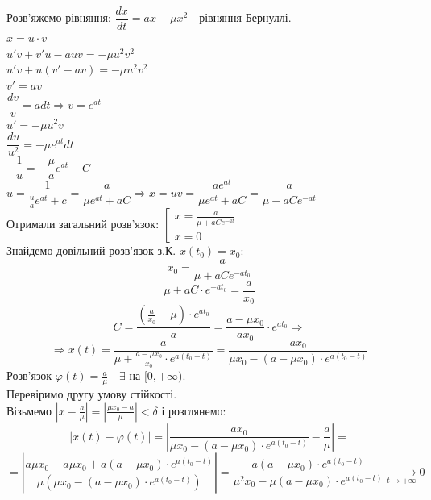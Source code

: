 Розв'яжемо рівняння: $ \dfrac{dx}{dt} = ax - \mu x^2 $ - рівняння Бернуллі.\\
$x = u\cdot v $\\
$u'v + v'u - auv = - \mu u^2 v^2 $\\
$u'v + u(v' - av) = - \mu u^2 v^2 $\\
$v' = av$\\
$ \dfrac{dv}{v} = adt \Longrightarrow v = e^{at}$\\
$u' =- \mu u^2 v$\\
$ \dfrac{du}{u^2} = - \mu e^{at}dt $\\
$- \dfrac{1}{u} = -\dfrac{ \mu}{a}e^{at} - C$\\
$ u = \dfrac{1}{ \frac{u}{a} e^{at} +c } = \dfrac{a}{ \mu e^{at} + aC} \Longrightarrow x = uv = \dfrac{a e^{at}}{ \mu e^{at} + aC  }  =  \dfrac{a}{ \mu  + aCe^{-at}}  $\\
$
\text{Отримали загальний розв'язок: } \left[ \begin{gathered}
 x= \frac{a}{ \mu  + aCe^{-at}}\\
 x = 0
\end{gathered} \right.
$\\


Знайдемо довільний розв'язок з.К. $x(t_0) = x_0:$
$$
x_0 = \frac{a}{\mu + aCe^{-at_0}}
$$
$$
\mu + aC\cdot e^{-at_0} = \frac{a}{x_0}
$$
$$
C = \frac{\left( \frac{a}{x_0} - \mu  \right)\cdot e^{at_0} }{a} = \frac{a - \mu x_0}{ax_0}\cdot e^{at_0} \Longrightarrow
$$
$$
\Longrightarrow x(t) = \frac{a}{ \mu + \frac{a - \mu x_0}{x_0} \cdot e^{a(t_0 - t)} } = \frac{ax_0}{ \mu x_0 - (a - \mu x_0 ) \cdot e^{a(t_0-t)}}
$$
Розв'язок $ \varphi (t) = \frac{a}{\mu} \quad \exists $  на $[0, + \infty)$.\\
Перевіримо другу умову стійкості. \\
Візьмемо $ \left| x - \frac{a}{\mu} \right| = \left| \frac{\mu x_0 - a}{\mu}  \right| < \delta $ і розглянемо:
$$
\left| x(t) - \varphi(t) \right| = \left| \frac{ax_0}{\mu x_0 - (a - \mu x_0) \cdot e^{a (t_0 - t)}}  - \frac{a}{ \mu}  \right| =
$$
$$
= \left| \frac{a\mu x_0 - a\mu x_0 + a (a - \mu x_0 )\cdot e^{a(t_0 - t)}}{\mu (\mu x_0 - (a- \mu x_0)\cdot e^{a(t_0 -t)})}  \right| = \frac{a (a - \mu x_0)\cdot e^{a (t_0 - t)}}{ \mu^2 x_0 - \mu (a- \mu x_0) \cdot e^{a(t_0 - t)}} \xrightarrow[t\to +\infty]{} 0
$$

